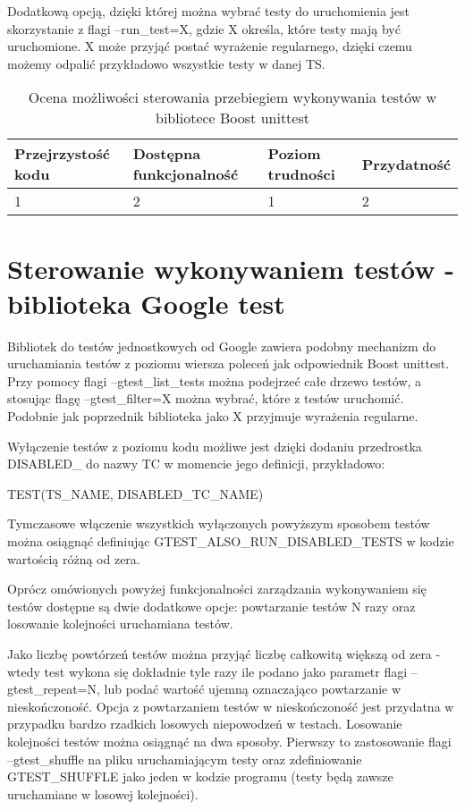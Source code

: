 \documentclass[12pt,a4paper,notitlepage]{report}
\begin{document}
Dodatkową opcją, dzięki której można wybrać testy do uruchomienia jest skorzystanie z flagi --run{\_}test=X, gdzie X określa, które testy mają być uruchomione. X może przyjąć postać wyrażenie regularnego, dzięki czemu możemy odpalić przykładowo wszystkie testy w danej TS.


\begin{center}
			\begin{table}[!ht]
			\caption{Ocena możliwości sterowania przebiegiem wykonywania testów w bibliotece Boost unittest}
			\label{}
			\begin{tabular}[!hc]{|l|l|l|l|}
		\hline
		Przejrzystość kodu 	&	Dostępna funkcjonalność	&	Poziom trudności	&	Przydatność \\ \hline
		1					&	2						&	1					& 	2  			\\ \hline
			\end{tabular}
			\end{table} 
		\end{center}

\section{Sterowanie wykonywaniem testów - biblioteka Google test}

Bibliotek do testów jednostkowych od Google zawiera podobny mechanizm do uruchamiania testów z poziomu wiersza poleceń jak odpowiednik Boost unittest.
Przy pomocy flagi --gtest{\_}list{\_}tests można podejrzeć całe drzewo testów, a stosując flagę --gtest{\_}filter=X można wybrać, które z testów uruchomić. Podobnie jak poprzednik biblioteka jako X przyjmuje wyrażenia regularne.

Wyłączenie testów z poziomu kodu możliwe jest dzięki dodaniu przedrostka DISABLED{\_} do nazwy TC w momencie jego definicji, przykładowo:

TEST(TS{\_}NAME, DISABLED{\_}TC{\_}NAME)

Tymczasowe włączenie wszystkich wyłączonych powyższym sposobem testów można osiągnąć definiując GTEST{\_}ALSO{\_}RUN{\_}DISABLED{\_}TESTS w kodzie wartością różną od zera.

Oprócz omówionych powyżej funkcjonalności zarządzania wykonywaniem się testów dostępne są dwie dodatkowe opcje: powtarzanie testów N razy oraz losowanie kolejności uruchamiana testów.

Jako liczbę powtórzeń testów można przyjąć liczbę całkowitą większą od zera - wtedy test wykona się dokładnie tyle razy ile podano jako parametr flagi --gtest{\_}repeat=N, lub podać wartość ujemną oznaczająco powtarzanie w nieskończoność. Opcja z powtarzaniem testów w nieskończoność jest przydatna w przypadku bardzo rzadkich losowych niepowodzeń w testach.
Losowanie kolejności testów można osiągnąć na dwa sposoby. Pierwszy to zastosowanie flagi --gtest{\_}shuffle na pliku uruchamiającym testy oraz zdefiniowanie GTEST{\_}SHUFFLE jako jeden w kodzie programu (testy będą zawsze uruchamiane w losowej kolejności).
\end{document}
